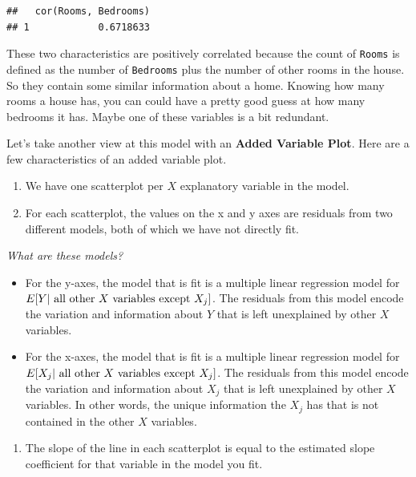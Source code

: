 \documentclass[
]{book}
\providecommand{\tightlist}{%
  \setlength{\itemsep}{0pt}\setlength{\parskip}{0pt}}
\begin{document}
\begin{verbatim}
##   cor(Rooms, Bedrooms)
## 1            0.6718633
\end{verbatim}

These two characteristics are positively correlated because the count of \texttt{Rooms} is defined as the number of \texttt{Bedrooms} plus the number of other rooms in the house. So they contain some similar information about a home. Knowing how many rooms a house has, you can could have a pretty good guess at how many bedrooms it has. Maybe one of these variables is a bit redundant.

Let's take another view at this model with an \textbf{Added Variable Plot}. Here are a few characteristics of an added variable plot.

\begin{enumerate}
\def\labelenumi{\arabic{enumi}.}
\tightlist
\item
  We have one scatterplot per \(X\) explanatory variable in the model.
\item
  For each scatterplot, the values on the x and y axes are residuals from two different models, both of which we have not directly fit.
\end{enumerate}

\emph{What are these models?}

\begin{itemize}
\tightlist
\item
  For the y-axes, the model that is fit is a multiple linear regression model for \(E[Y |\hbox{ all other }X\hbox{ variables except }X_j]\). The residuals from this model encode the variation and information about \(Y\) that is left unexplained by other \(X\) variables.
\item
  For the x-axes, the model that is fit is a multiple linear regression model for \(E[X_j | \hbox{ all other }X\hbox{ variables except }X_j]\). The residuals from this model encode the variation and information about \(X_j\) that is left unexplained by other \(X\) variables. In other words, the unique information the \(X_j\) has that is not contained in the other \(X\) variables.
\end{itemize}

\begin{enumerate}
\def\labelenumi{\arabic{enumi}.}
\setcounter{enumi}{2}
\tightlist
\item
  The slope of the line in each scatterplot is equal to the estimated slope coefficient for that variable in the model you fit.
\end{enumerate}
\end{document}
